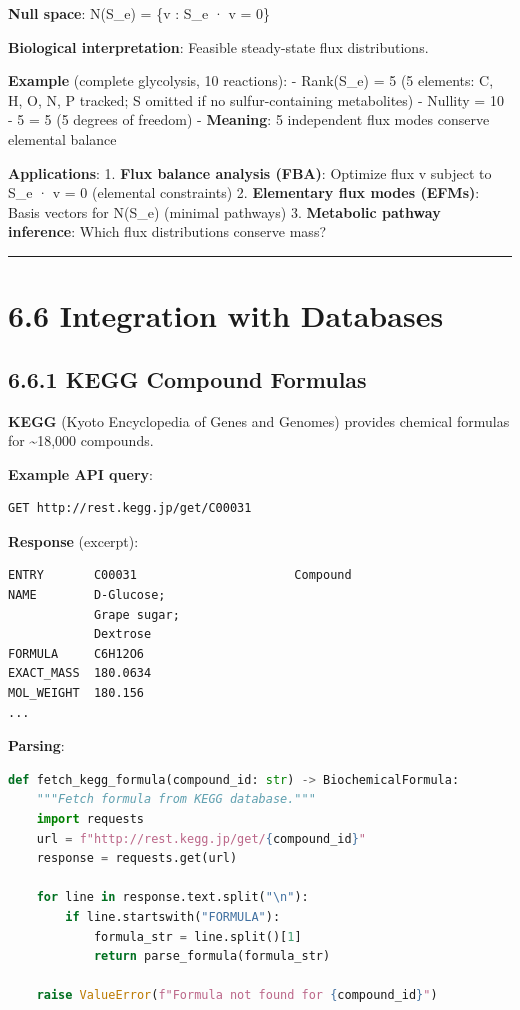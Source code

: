 \textbf{Null space}: N(S\_e) = \{v : S\_e · v = 0\}

\textbf{Biological interpretation}: Feasible steady-state flux
distributions.

\textbf{Example} (complete glycolysis, 10 reactions): - Rank(S\_e) = 5
(5 elements: C, H, O, N, P tracked; S omitted if no sulfur-containing
metabolites) - Nullity = 10 - 5 = 5 (5 degrees of freedom) -
\textbf{Meaning}: 5 independent flux modes conserve elemental balance

\textbf{Applications}: 1. \textbf{Flux balance analysis (FBA)}: Optimize
flux v subject to S\_e · v = 0 (elemental constraints) 2.
\textbf{Elementary flux modes (EFMs)}: Basis vectors for N(S\_e)
(minimal pathways) 3. \textbf{Metabolic pathway inference}: Which flux
distributions conserve mass?

\begin{center}\rule{0.5\linewidth}{0.5pt}\end{center}

\hypertarget{integration-with-databases}{%
\section{6.6 Integration with
Databases}\label{integration-with-databases}}

\hypertarget{kegg-compound-formulas}{%
\subsection{6.6.1 KEGG Compound Formulas}\label{kegg-compound-formulas}}

\textbf{KEGG} (Kyoto Encyclopedia of Genes and Genomes) provides
chemical formulas for \textasciitilde18,000 compounds.

\textbf{Example API query}:

\begin{lstlisting}
GET http://rest.kegg.jp/get/C00031
\end{lstlisting}

\textbf{Response} (excerpt):

\begin{lstlisting}
ENTRY       C00031                      Compound
NAME        D-Glucose;
            Grape sugar;
            Dextrose
FORMULA     C6H12O6
EXACT_MASS  180.0634
MOL_WEIGHT  180.156
...
\end{lstlisting}

\textbf{Parsing}:

\begin{lstlisting}[language=Python]
def fetch_kegg_formula(compound_id: str) -> BiochemicalFormula:
    """Fetch formula from KEGG database."""
    import requests
    url = f"http://rest.kegg.jp/get/{compound_id}"
    response = requests.get(url)
    
    for line in response.text.split("\n"):
        if line.startswith("FORMULA"):
            formula_str = line.split()[1]
            return parse_formula(formula_str)
    
    raise ValueError(f"Formula not found for {compound_id}")
\end{lstlisting}

